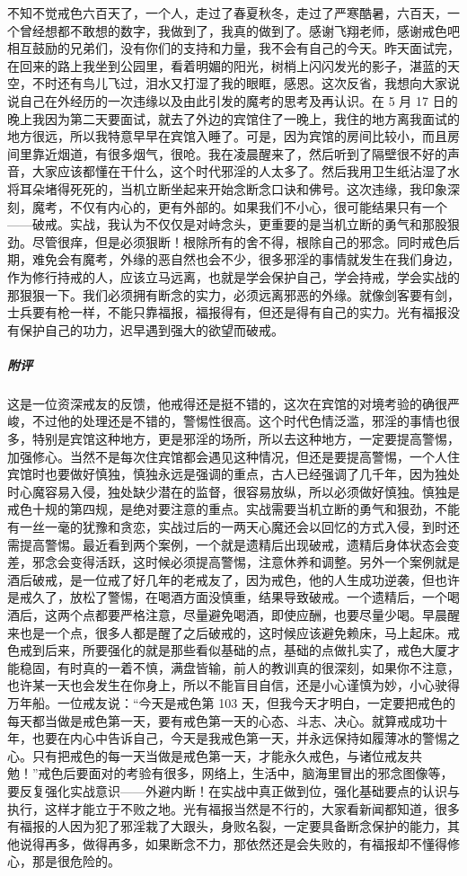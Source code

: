 \begin{case}
    不知不觉戒色六百天了，一个人，走过了春夏秋冬，走过了严寒酷暑，六百天，一个曾经想都不敢想的数字，我做到了，我真的做到了。感谢飞翔老师，感谢戒色吧相互鼓励的兄弟们，没有你们的支持和力量，我不会有自己的今天。昨天面试完，在回来的路上我坐到公园里，看着明媚的阳光，树梢上闪闪发光的影子，湛蓝的天空，不时还有鸟儿飞过，泪水又打湿了我的眼眶，感恩。这次反省，我想向大家说说自己在外经历的一次违缘以及由此引发的魔考的思考及再认识。在 5 月 17 日的晚上我因为第二天要面试，就去了外边的宾馆住了一晚上，我住的地方离我面试的地方很远，所以我特意早早在宾馆入睡了。可是，因为宾馆的房间比较小，而且房间里靠近烟道，有很多烟气，很呛。我在凌晨醒来了，然后听到了隔壁很不好的声音，大家应该都懂在干什么，这个时代邪淫的人太多了。然后我用卫生纸沾湿了水将耳朵堵得死死的，当机立断坐起来开始念断念口诀和佛号。这次违缘，我印象深刻，魔考，不仅有内心的，更有外部的。如果我们不小心，很可能结果只有一个——破戒。实战，我认为不仅仅是对峙念头，更重要的是当机立断的勇气和那股狠劲。尽管很痒，但是必须狠断！根除所有的舍不得，根除自己的邪念。同时戒色后期，难免会有魔考，外缘的恶自然也会不少，很多邪淫的事情就发生在我们身边，作为修行持戒的人，应该立马远离，也就是学会保护自己，学会持戒，学会实战的那狠狠一下。我们必须拥有断念的实力，必须远离邪恶的外缘。就像剑客要有剑，士兵要有枪一样，不能只靠福报，福报得有，但还是得有自己的实力。光有福报没有保护自己的功力，迟早遇到强大的欲望而破戒。
    \subparagraph{附评} 这是一位资深戒友的反馈，他戒得还是挺不错的，这次在宾馆的对境考验的确很严峻，不过他的处理还是不错的，警惕性很高。这个时代色情泛滥，邪淫的事情也很多，特别是宾馆这种地方，更是邪淫的场所，所以去这种地方，一定要提高警惕，加强修心。当然不是每次住宾馆都会遇见这种情况，但还是要提高警惕，一个人住宾馆时也要做好慎独，慎独永远是强调的重点，古人已经强调了几千年，因为独处时心魔容易入侵，独处缺少潜在的监督，很容易放纵，所以必须做好慎独。慎独是戒色十规的第四规，是绝对要注意的重点。实战需要当机立断的勇气和狠劲，不能有一丝一毫的犹豫和贪恋，实战过后的一两天心魔还会以回忆的方式入侵，到时还需提高警惕。最近看到两个案例，一个就是遗精后出现破戒，遗精后身体状态会变差，邪念会变得活跃，这时候必须提高警惕，注意休养和调整。另外一个案例就是酒后破戒，是一位戒了好几年的老戒友了，因为戒色，他的人生成功逆袭，但也许是戒久了，放松了警惕，在喝酒方面没慎重，结果导致破戒。一个遗精后，一个喝酒后，这两个点都要严格注意，尽量避免喝酒，即使应酬，也要尽量少喝。早晨醒来也是一个点，很多人都是醒了之后破戒的，这时候应该避免赖床，马上起床。戒色戒到后来，所要强化的就是那些看似基础的点，基础的点做扎实了，戒色大厦才能稳固，有时真的一着不慎，满盘皆输，前人的教训真的很深刻，如果你不注意，也许某一天也会发生在你身上，所以不能盲目自信，还是小心谨慎为妙，小心驶得万年船。一位戒友说：“今天是戒色第 103 天，但我今天才明白，一定要把戒色的每天都当做是戒色第一天，要有戒色第一天的心态、斗志、决心。就算戒成功十年，也要在内心中告诉自己，今天是我戒色第一天，并永远保持如履薄冰的警惕之心。只有把戒色的每一天当做是戒色第一天，才能永久戒色，与诸位戒友共勉！”戒色后要面对的考验有很多，网络上，生活中，脑海里冒出的邪念图像等，要反复强化实战意识——外避内断！在实战中真正做到位，强化基础要点的认识与执行，这样才能立于不败之地。光有福报当然是不行的，大家看新闻都知道，很多有福报的人因为犯了邪淫栽了大跟头，身败名裂，一定要具备断念保护的能力，其他说得再多，做得再多，如果断念不力，那依然还是会失败的，有福报却不懂得修心，那是很危险的。
\end{case}

